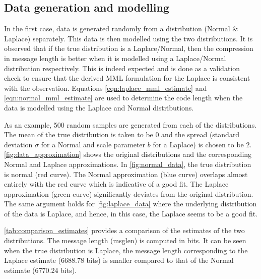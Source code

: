 \documentclass[wcp]{jmlr}
\begin{document}
\subsection{Data generation and modelling}
In the first case, data is generated randomly from a distribution (Normal \& Laplace) 
separately. This data is then modelled using the two distributions.
It is observed that if the true distribution is a Laplace/Normal, then the
compression in message length is better when it is modelled using a Laplace/Normal
distribution respectively. This is indeed expected and is done as a validation check to ensure that 
the derived MML formulation for the Laplace is consistent with the observation. Equations
\eqref{eqn:laplace_mml_estimate} and \eqref{eqn:normal_mml_estimate} are used to determine
the code length when the data is modelled using the Laplace and Normal distributions.

As an example, 500 random samples are generated from each of the distributions.
The mean of the true distribution is taken to be 0 and the spread (standard
deviation $\sigma$ for a Normal and scale parameter $b$ for a Laplace) is
chosen to be 2. \autoref{fig:data_approximation} shows the original distributions
and the corresponding Normal and Laplace approximations. In \autoref{fig:normal_data},
the true distribution is normal (red curve). The Normal approximation (blue curve)
overlaps almost entirely with the red curve which is indicative of a good fit.
The Laplace approximation (green curve) significantly deviates from the original
distribution. The same argument holds for \autoref{fig:laplace_data} where the
underlying distribution of the data is Laplace, and hence, in this case, the Laplace
seems to be a good fit. 

\autoref{tab:comparison_estimates} provides a comparison of the estimates of the
two distributions. The message length (msglen) is computed in bits. It can be seen
when the true distribution is Laplace, the message length corresponding to the Laplace 
estimate (6688.78 bits) is smaller compared to that of the Normal estimate (6770.24 bits).
\end{document}

